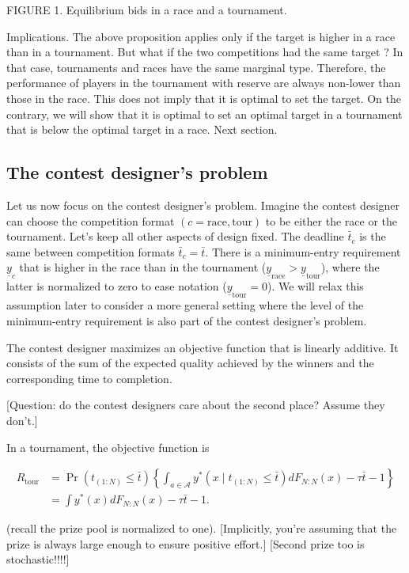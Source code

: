 \documentclass[12pt,]{article}
\newcommand\deadline{\bar{t}}
\newcommand\target{\underline{y}}
\newcommand\race{\text{race}}
\newcommand\tournament{\text{tour}}
\begin{document}
FIGURE 1. Equilibrium bids in a race and a tournament.

Implications. The above proposition applies only if the target is higher
in a race than in a tournament. But what if the two competitions had the
same target ? In that case, tournaments and races have the same marginal
type. Therefore, the performance of players in the tournament with
reserve are always non-lower than those in the race. This does not imply
that it is optimal to set the target. On the contrary, we will show that
it is optimal to set an optimal target in a tournament that is below the
optimal target in a race. Next section.

\subsection{The contest designer's
problem}\label{the-contest-designers-problem}

Let us now focus on the contest designer's problem. Imagine the contest
designer can choose the competition format \((c=\race, \tournament)\) to
be either the race or the tournament. Let's keep all other aspects of
design fixed. The deadline \(\deadline_c\) is the same between
competition formats \(\deadline_c=\deadline\). There is a minimum-entry
requirement \(\target_c\) that is higher in the race than in the
tournament (\(\target_\race > \target_\tournament\)), where the latter
is normalized to zero to ease notation (\(\target_\tournament=0\)). We
will relax this assumption later to consider a more general setting
where the level of the minimum-entry requirement is also part of the
contest designer's problem.

The contest designer maximizes an objective function that is linearly
additive. It consists of the sum of the expected quality achieved by the
winners and the corresponding time to completion.

{[}Question: do the contest designers care about the second place?
Assume they don't.{]}

In a tournament, the objective function is

\begin{align}
R_\tournament & = \Pr(t_{(1:N)}\leq \deadline) \left\{\int_{a\in\mathcal A} y^*(x \mid t_{(1:N)}\leq \deadline) dF_{N:N}(x) - \tau \deadline - 1 \right\} \nonumber\\
  & = \int y^*(x) dF_{N:N}(x) - \tau \deadline - 1. 
\end{align}

(recall the prize pool is normalized to one). {[}Implicitly, you're
assuming that the prize is always large enough to ensure positive
effort.{]} {[}Second prize too is stochastic!!!!{]}
\end{document}
